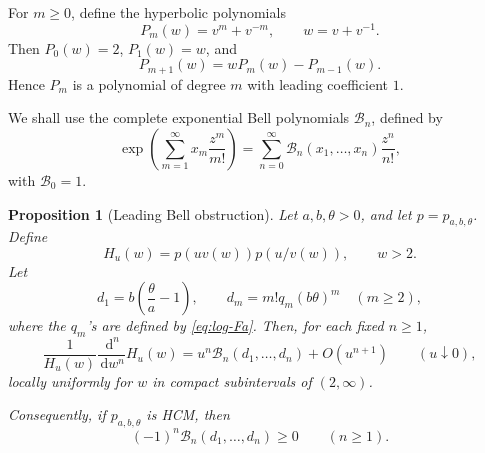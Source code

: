 ﻿\documentclass[preprint,12pt,authoryear]{elsarticle}
\newtheorem{proposition}{Proposition}
\newcommand{\dd}{\,\mathrm{d}}
\begin{document}
For \(m\ge0\), define the hyperbolic polynomials
\begin{equation}
P_m(w)=v^m+v^{-m},
\qquad
w=v+v^{-1}.
\end{equation}
Then \(P_0(w)=2\), \(P_1(w)=w\), and
\begin{equation}
P_{m+1}(w)=wP_m(w)-P_{m-1}(w).
\end{equation}
Hence \(P_m\) is a polynomial of degree \(m\) with leading coefficient \(1\).

We shall use the complete exponential Bell polynomials \(\mathcal B_n\), defined by
\begin{equation}
\label{eq:bell-def}
\exp\left(\sum_{m=1}^{\infty}x_m\frac{z^m}{m!}\right)
=
\sum_{n=0}^{\infty}
\mathcal B_n(x_1,\dots,x_n)\frac{z^n}{n!},
\end{equation}
with \(\mathcal B_0=1\).

\begin{proposition}[Leading Bell obstruction]
\label{prop:bell-obstruction}
Let \(a,b,\theta>0\), and let \(p=p_{a,b,\theta}\).  Define
\begin{equation}
H_u(w)=p(uv(w))p(u/v(w)),
\qquad w>2.
\end{equation}
Let
\begin{equation}
d_1=b\left(\frac{\theta}{a}-1\right),
\qquad
d_m=m!q_m(b\theta)^m
\quad(m\ge2),
\end{equation}
where the \(q_m\)'s are defined by \eqref{eq:log-Fa}.  Then, for each fixed \(n\ge1\),
\begin{equation}
\label{eq:bell-leading}
\frac{1}{H_u(w)}
\frac{\dd^n}{\dd w^n}H_u(w)
=
u^n\mathcal B_n(d_1,\dots,d_n)
+
O(u^{n+1})
\qquad
(u\downarrow0),
\end{equation}
locally uniformly for \(w\) in compact subintervals of \((2,\infty)\).

Consequently, if \(p_{a,b,\theta}\) is HCM, then
\begin{equation}
\label{eq:hcm-necessary-bell}
(-1)^n\mathcal B_n(d_1,\dots,d_n)\ge0
\qquad(n\ge1).
\end{equation}
\end{proposition}
\end{document}
